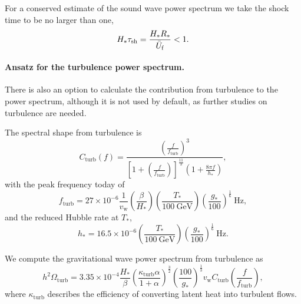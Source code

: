 \documentclass[10pt]{article}
\begin{document}
For a conserved estimate of the sound wave power spectrum we take the shock time to be no larger than one,
\begin{equation}
    H_*\tau_\mathrm{sh}=\frac{H_*R_*}{\Bar{U}_\mathrm{f}}<1.
\end{equation}

\paragraph{Ansatz for the turbulence power spectrum.}
There is also an option to calculate the contribution from turbulence to the power spectrum, although it is not used by default, as further studies on turbulence are needed.

The spectral shape from turbulence is \cite{weir18}
\begin{equation}
    C_\mathrm{turb}(f) = \frac{\left(\frac{f}{f_\mathrm{turb}}\right)^3}{\left[1+\left(\frac{f}{f_\mathrm{turb}}\right)\right]^{\frac{11}{3}} \left(1+\frac{8\pi f}{h_*}\right)},
\end{equation}
with the peak frequency today of
\begin{equation}
    f_\mathrm{turb} = 27\times10^{-6} \frac{1}{v_\mathrm{w}} \left(\frac{\beta}{H_*}\right) \left(\frac{T_*}{100 \ \mathrm{GeV}}\right) \left(\frac{g_*}{100}\right)^{\frac{1}{6}} \ \mathrm{Hz},
\end{equation}
and the reduced Hubble rate at $T_*$,
\begin{equation}
    h_* = 16.5\times10^{-6} \left(\frac{T_*}{100 \ \mathrm{GeV}}\right) \left(\frac{g_*}{100}\right)^{\frac{1}{6}} \ \mathrm{Hz}.
\end{equation}

We compute the gravitational wave power spectrum from turbulence as \cite{weir18}
\begin{equation}
    h^2\Omega_\mathrm{turb} = 3.35\times10^{-4} \frac{H_*}{\beta} \left(\frac{\kappa_\mathrm{turb}\alpha}{1+\alpha}\right)^{\frac{3}{2}} \left(\frac{100}{g_*}\right)^{\frac{1}{3}} v_\mathrm{w} C_\mathrm{turb}\left(\frac{f}{f_\mathrm{turb}}\right),
\end{equation}
where $\kappa_\mathrm{turb}$ describes the efficiency of converting latent heat into turbulent flows.

\end{document}
